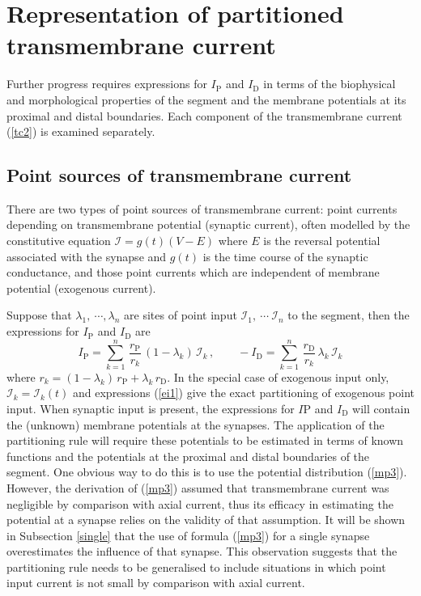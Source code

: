 \section{Representation of partitioned transmembrane current}\label{part}
Further progress requires expressions for $I_\mathrm{P}$ and
$I_\mathrm{D}$ in terms of the biophysical and morphological
properties of the segment and the membrane potentials at its
proximal and distal boundaries. Each component of the
transmembrane current (\ref{tc2}) is examined separately.

\subsection{Point sources of transmembrane current}
There are two types of point sources of transmembrane current:
point currents depending on transmembrane potential (synaptic
current), often modelled by the constitutive equation
$\mathcal{I}=g(t)(V-E)$ where $E$ is the reversal potential
associated with the synapse and $g(t)$ is the time course of the
synaptic conductance, and those point currents which are
independent of membrane potential (exogenous current).

Suppose that $\lambda_1,\ \cdots,\lambda_n$ are sites of
point input $\mathcal{I}_1,\ \cdots\ \mathcal{I}_n$
to the segment, then the expressions for $I_\mathrm{P}$ and
$I_\mathrm{D}$ are
\begin{equation}\label{ei1}
I_\mathrm{P} = \sum_{k=1}^n\,
\frac{r_\mathrm{P}}{r_k}\,(1-\lambda_k)\,\mathcal{I}_k\,,\qquad
-I_\mathrm{D} = \sum_{k=1}^n\,
\frac{r_\mathrm{D}}{r_k}\,\lambda_k\,\mathcal{I}_k
\end{equation}
where $r_k=(1-\lambda_k)\,r_\mathrm{P} +\lambda_k\,r_\mathrm{D}$.
In the special case of exogenous input only,
$\mathcal{I}_k=\mathcal{I}_k(t)$ and expressions (\ref{ei1}) give
the exact partitioning of exogenous point input. When synaptic
input is present, the expressions for $I\mathrm{P}$ and
$I_\mathrm{D}$ will contain the (unknown) membrane potentials at
the synapses. The application of the partitioning rule will
require these potentials to be estimated in terms of known
functions and the potentials at the proximal and distal boundaries
of the segment. One obvious way to do this is to use the potential
distribution (\ref{mp3}). However, the derivation of (\ref{mp3})
assumed that transmembrane current was negligible by comparison
with axial current, thus its efficacy in estimating the potential
at a synapse relies on the validity of that assumption. It will be
shown in Subsection \ref{single} that the use of formula
(\ref{mp3}) for a single synapse overestimates the influence of
that synapse. This observation suggests that the partitioning rule
needs to be generalised to include situations in which point input
current is not small by comparison with axial current.

